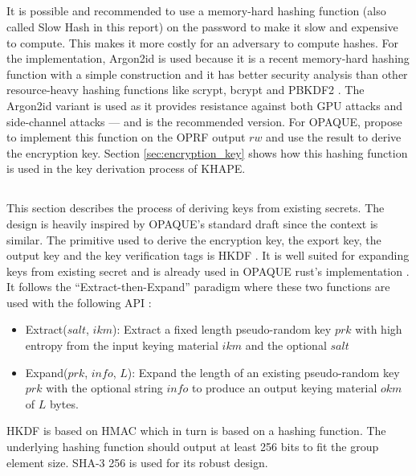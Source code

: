 ﻿\documentclass[../report.tex]{subfiles}
\begin{document}
\subsection{} \label{sec:design_choice_slowhash}
It is possible and recommended to use a memory-hard hashing function (also called Slow Hash in this report) on the password to make it slow and expensive to compute. 
This makes it more costly for an adversary to compute hashes.
For the implementation, Argon2id \cite{Argon2_Paper} is used because it is a recent memory-hard hashing function with a simple construction and it has better security analysis than other resource-heavy hashing functions like scrypt, bcrypt and PBKDF2 \cite{CAA}. The Argon2id variant is used as it provides resistance against both GPU attacks and side-channel attacks --- and is the recommended version.
For OPAQUE, \cite{OPAQUE_Standard_Draft} propose to implement this function on the OPRF output $rw$ and use the result to derive the encryption key. Section \ref{sec:encryption_key} shows how this hashing function is used in the key derivation process of KHAPE.


\subsection{}
This section describes the process of deriving keys from existing secrets. The design is heavily inspired by OPAQUE's standard draft \cite{OPAQUE_Standard_Draft} since the context is similar.
The primitive used to derive the encryption key, the export key, the output key and the key verification tags is HKDF \cite{HKDF_RFC}. It is well suited for expanding keys from existing secret and is already used in OPAQUE rust's implementation \cite{OPAQUE_KE_lib}. It follows the ``Extract-then-Expand'' paradigm where these two functions are used with the following API :

\begin{itemize}
 \item Extract($salt$, $ikm$): Extract a fixed length pseudo-random key $prk$ with high entropy from the input keying material $ikm$ and the optional $salt$
 \item Expand($prk$, $info$, $L$): Expand the length of an existing pseudo-random key $prk$ with the optional string $info$ to produce an output keying material $okm$ of $L$ bytes.
\end{itemize}

HKDF is based on HMAC which in turn is based on a hashing function. The underlying hashing function should output at least 256 bits to fit the group element size. SHA-3 256 is used for its robust design.
\end{document}
